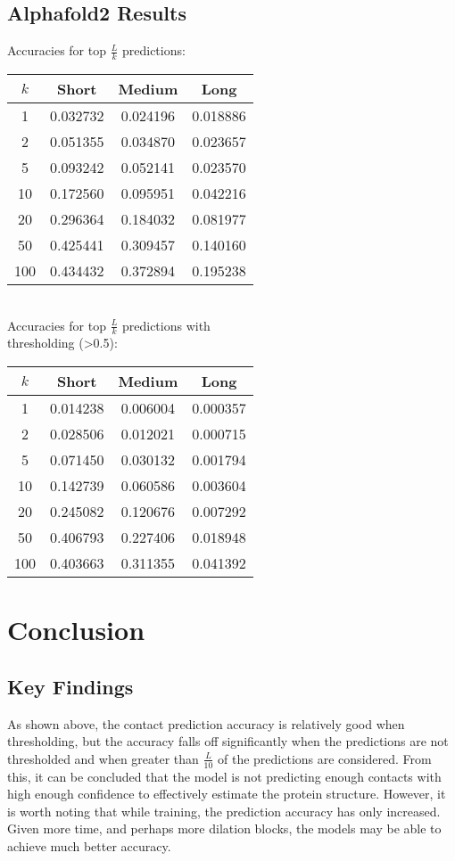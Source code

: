 \documentclass[11pt]{article}
\begin{document}
\begin{minipage}{0.45\textwidth}
\subsection{Alphafold2 Results}
Accuracies for top $\frac{L}{k}$ predictions:\\[4mm]
\begin{tabular}{c||c|c|c}
$k$ & Short & Medium & Long\\
\hline
1   & 0.032732 & 0.024196 & 0.018886\\
2   & 0.051355 & 0.034870 & 0.023657\\
5   & 0.093242 & 0.052141 & 0.023570\\
10  & 0.172560 & 0.095951 & 0.042216\\
20  & 0.296364 & 0.184032 & 0.081977\\
50  & 0.425441 & 0.309457 & 0.140160\\
100 & 0.434432 & 0.372894 & 0.195238
\end{tabular}\\[6mm]

Accuracies for top $\frac{L}{k}$ predictions with\\thresholding (>0.5):\\[4mm]
\begin{tabular}{c||c|c|c}
$k$ & Short & Medium & Long\\
\hline
1   & 0.014238 & 0.006004 & 0.000357\\
2   & 0.028506 & 0.012021 & 0.000715\\
5   & 0.071450 & 0.030132 & 0.001794\\
10  & 0.142739 & 0.060586 & 0.003604\\
20  & 0.245082 & 0.120676 & 0.007292\\
50  & 0.406793 & 0.227406 & 0.018948\\
100 & 0.403663 & 0.311355 & 0.041392
\end{tabular}
\end{minipage}

\section{Conclusion}
\subsection{Key Findings}
As shown above, the contact prediction accuracy is relatively good when thresholding, but the accuracy falls off significantly when the predictions are not thresholded and when greater than $\frac{L}{10}$ of the predictions are considered.  From this, it can be concluded that the model is not predicting enough contacts with high enough confidence to effectively estimate the protein structure.  However, it is worth noting that while training, the prediction accuracy has only increased.  Given more time, and perhaps more dilation blocks, the models may be able to achieve much better accuracy.
\end{document}
